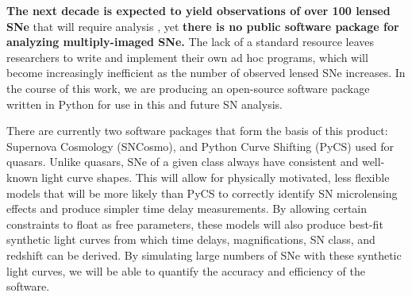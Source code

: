 %
%
%
%
%
%


\textbf{The next decade is expected to yield observations
of over 100 lensed SNe} that will require analysis \citep{Oguri:2010},
yet \textbf{there is no public software package for analyzing multiply-imaged SNe.}
The lack of a standard resource leaves researchers to write and implement their 
own ad hoc programs, which will become increasingly inefficient as the number of
observed lensed SNe increases. In the course of this work, 
we are producing an open-source software package written in Python for use in this and future SN analysis.

There are currently two software packages that form the basis 
of this product: Supernova Cosmology (SNCosmo), and Python Curve Shifting (PyCS) used for quasars. Unlike quasars, 
SNe of a given class always have consistent and well-known light curve shapes. This will allow for physically motivated, 
less flexible models that will be more likely than PyCS to correctly identify SN 
microlensing effects and produce simpler time delay measurements. By allowing certain constraints to float as free 
parameters, these models will also produce best-fit synthetic light curves from which time delays, magnifications, 
SN class, and redshift can be derived. By simulating large numbers of SNe with these synthetic light curves, we will 
be able to quantify the accuracy and efficiency of the software.

